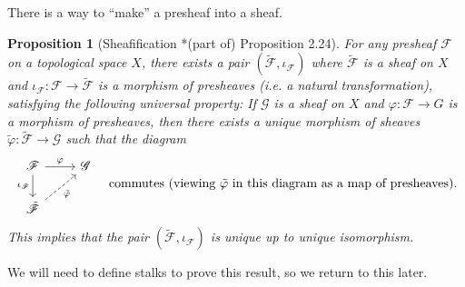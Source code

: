 \documentclass[11pt,leqno]{article}
\theoremstyle{plain}
\newtheorem{proposition}[lem]{Proposition}
\theoremstyle{definition}
\numberwithin{equation}{section}
\numberwithin{lem}{section}
\begin{document}
There is a way to ``make'' a presheaf into a sheaf.
\begin{proposition}[Sheafification \cite{gw}*{(part of) Proposition 2.24}]
  For any presheaf $\mathscr F$ on a topological space $X$, there exists a pair $(\tilde{\mathscr F}, \iota_{\mathscr F})$ where $\tilde{\mathscr F}$ is a sheaf on $X$ and $\iota_{\mathscr F}\colon \mathscr F\to\tilde{\mathscr F}$ is a morphism of presheaves (i.e. a natural transformation), satisfying the following universal property: If $\mathscr G$ is a sheaf on $X$ and $\varphi\colon\mathscr F\to G$ is a morphism of presheaves, then there exists a unique morphism of sheaves $\tilde{\varphi}\colon\tilde{\mathscr F}\to \mathscr G$ such that the diagram
  \begin{equation}
    \begin{tikzcd}[ampersand replacement=\&]
      {\mathscr F} \& {\mathscr G} \\
      {\tilde{\mathscr F}}
      \arrow["\varphi", from=1-1, to=1-2]
      \arrow["{\iota_{\mathscr F}}"', from=1-1, to=2-1]
      \arrow["{\tilde{\varphi}}"', dashed, from=2-1, to=1-2]
    \end{tikzcd}\quad\text{commutes \textup{(}viewing $\tilde{\varphi}$ in this diagram as a map of presheaves\textup{)}.}
  \end{equation}
  This implies that the pair $(\tilde{\mathscr F},\iota_{\mathscr F})$ is unique up to unique isomorphism.
\end{proposition}
We will need to define stalks to prove this result, so we return to this later.
\end{document}
